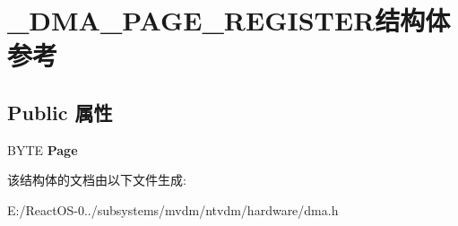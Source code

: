 \hypertarget{struct___d_m_a___p_a_g_e___r_e_g_i_s_t_e_r}{}\section{\+\_\+\+D\+M\+A\+\_\+\+P\+A\+G\+E\+\_\+\+R\+E\+G\+I\+S\+T\+E\+R结构体 参考}
\label{struct___d_m_a___p_a_g_e___r_e_g_i_s_t_e_r}
\subsection*{Public 属性}
\begin{DoxyCompactItemize}
\item 
\mbox{\label{struct___d_m_a___p_a_g_e___r_e_g_i_s_t_e_r_ab7f2b04e7168eea36e501d290be241dc}} 
B\+Y\+TE {\bfseries Page}
\end{DoxyCompactItemize}


该结构体的文档由以下文件生成\+:\begin{DoxyCompactItemize}
\item 
E\+:/\+React\+O\+S-\/0../subsystems/mvdm/ntvdm/hardware/dma.\+h\end{DoxyCompactItemize}
